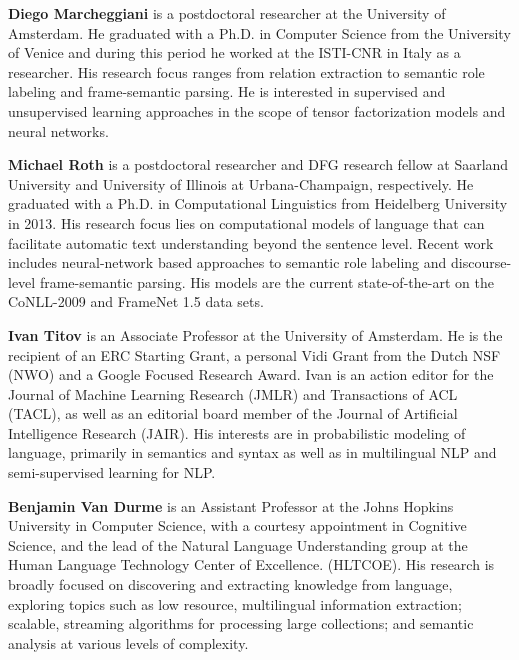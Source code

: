 \begin{bio}
\small
\textbf{Diego Marcheggiani} is a postdoctoral researcher at the University of Amsterdam. He graduated with a Ph.D. in Computer Science from the University of Venice and during this period he worked at the ISTI-CNR in Italy as a researcher. His research focus ranges from relation extraction to semantic role labeling and frame-semantic parsing. He is interested in supervised and unsupervised learning approaches in the scope of tensor factorization models and neural networks.

\textbf{Michael Roth} is a postdoctoral researcher and DFG research fellow at Saarland University and University of Illinois at Urbana-Champaign, respectively. He graduated with a Ph.D. in Computational Linguistics from Heidelberg University in 2013. His research focus lies on computational models of language that can facilitate automatic text understanding beyond the sentence level. Recent work includes neural-network based approaches to semantic role labeling and discourse-level frame-semantic parsing. His models are the current state-of-the-art on the CoNLL-2009 and FrameNet 1.5 data sets.

\textbf{Ivan Titov} is an Associate Professor at the University of Amsterdam. He is the recipient of an ERC Starting Grant, a personal Vidi Grant from the Dutch NSF (NWO) and a Google Focused Research Award. Ivan is an action editor for the Journal of Machine Learning Research (JMLR) and Transactions of ACL (TACL), as well as an editorial board member of the Journal of Artificial Intelligence Research (JAIR). His interests are in probabilistic modeling of language, primarily in semantics and syntax as well as in multilingual NLP and semi-supervised learning for NLP.

\textbf{Benjamin Van Durme} is an Assistant Professor at the Johns Hopkins University in Computer Science, with a courtesy appointment in Cognitive Science, and the lead of the Natural Language Understanding group at the Human Language Technology Center of Excellence. (HLTCOE). His research is broadly focused on discovering and extracting knowledge from language, exploring topics such as low resource, multilingual information extraction; scalable, streaming algorithms for processing large collections; and semantic analysis at various levels of complexity.

\end{bio}

